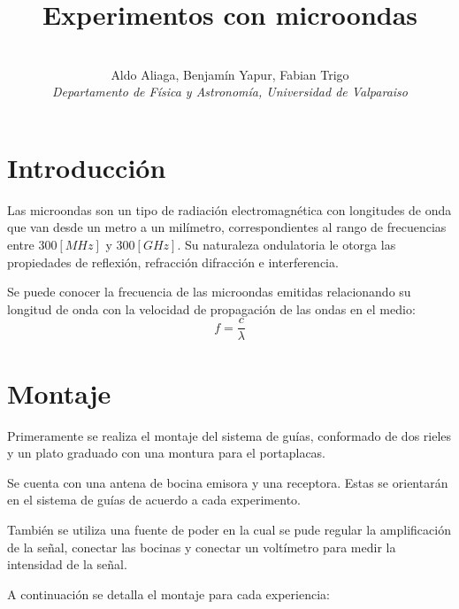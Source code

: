 \documentclass[a4paper,twocolumn,10pt]{article}
\begin{document}
\title{Experimentos con microondas}
\author{ \\Aldo Aliaga, Benjamín Yapur, Fabian Trigo \\ \textit{Departamento de Física y Astronomía, Universidad de Valparaiso}}
\twocolumn[
  \begin{@twocolumnfalse}
    \maketitle
    \begin{abstract}
    
    \end{abstract}
  \end{@twocolumnfalse}\bigskip]

\vspace{2cm}

\section{Introducción}

Las microondas son un tipo de radiación electromagnética con longitudes de onda que van desde un metro a un milímetro, correspondientes al rango de frecuencias entre $300[MHz]$ y $300[GHz]$. Su naturaleza ondulatoria le otorga las propiedades de reflexión, refracción difracción e interferencia. 

Se puede conocer la frecuencia de las microondas emitidas relacionando su longitud de onda con la velocidad de propagación de las ondas en el medio:
\begin{equation}
    f=\frac{c}{\lambda}
\end{equation}


\section{Montaje}

Primeramente se realiza el montaje del sistema de guías, conformado de dos rieles y un plato graduado con una montura para el portaplacas.

Se cuenta con una antena de bocina emisora y una receptora. Estas se orientarán en el sistema de guías de acuerdo a cada experimento.

También se utiliza una fuente de poder en la cual se pude regular la amplificación de la señal, conectar las bocinas y conectar un voltímetro para medir la intensidad de la señal.

A continuación se detalla el montaje para cada experiencia:
\end{document}
